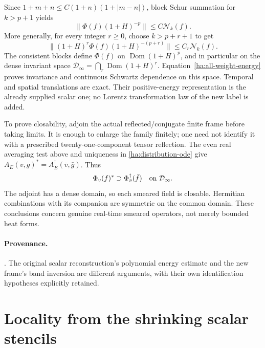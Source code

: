 Since $1+m+n\leq C(1+n)(1+|m-n|)$, block Schur summation for
$k>p+1$ yields
\begin{equation}
 \|\Phi(f)(1+H)^{-p}\|\leq C\mathcal N_k(f).
 \label{ha:one-sided-energy}
\end{equation}
More generally, for every integer $r\geq0$, choose $k>p+r+1$ to get
\begin{equation}
 \|(1+H)^r\Phi(f)(1+H)^{-(p+r)}\|
                  \leq C_r\mathcal N_{k}(f).
 \label{ha:all-weight-energy}
\end{equation}
The consistent blocks define $\Phi(f)$ on $\operatorname{Dom}(1+H)^p$,
and in particular on the dense invariant space
$\mathcal D_\infty=\bigcap_r\operatorname{Dom}(1+H)^r$.
Equation~\eqref{ha:all-weight-energy} proves invariance and continuous
Schwartz dependence on this space.  Temporal and spatial translations
are exact.  Their positive-energy representation is the already supplied
scalar one; no Lorentz transformation law of the new label is added.

To prove closability, adjoin the actual reflected/conjugate finite frame
before taking limits.  It is enough to enlarge the family finitely; one
need not identify it with a prescribed twenty-one-component tensor
reflection.  The even real averaging test above and uniqueness in
\eqref{ha:distribution-ode} give
$A_E(v,g)^*=A_E^\dagger(\bar v,\bar g)$.  Thus
\begin{equation}
 \Phi_v(f)^*\supset\Phi_{\bar v}^{\dagger}(\bar f)
                   \quad\hbox{on }\mathcal D_\infty.
 \label{ha:adjoint}
\end{equation}
The adjoint has a dense domain, so each smeared field is closable.
Hermitian combinations with its companion are symmetric on the common
domain.  These conclusions concern genuine real-time smeared operators,
not merely bounded heat forms.

\paragraph{Provenance.}
.
The original scalar reconstruction's polynomial energy estimate and the
new frame's band inversion are different arguments, with their own
identification hypotheses explicitly retained.

\section{Locality from the shrinking scalar stencils}
\label{ha:locality}

